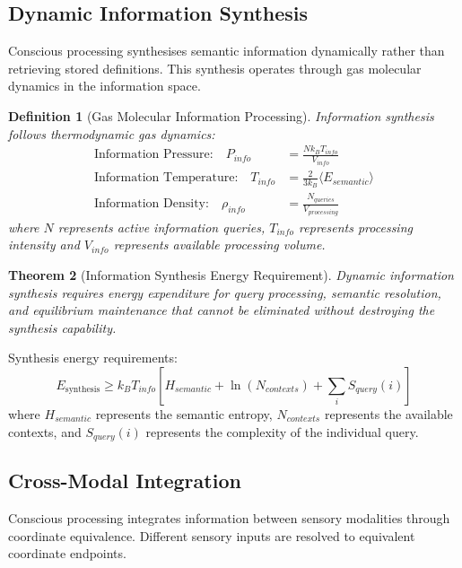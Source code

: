 \documentclass[12pt,a4paper]{article}
\newtheorem{theorem}{Theorem}[section]
\newtheorem{definition}[theorem]{Definition}
\begin{document}
\subsection{Dynamic Information Synthesis}

Conscious processing synthesises semantic information dynamically rather than retrieving stored definitions. This synthesis operates through gas molecular dynamics in the information space.

\begin{definition}[Gas Molecular Information Processing]
Information synthesis follows thermodynamic gas dynamics:
\begin{align}
\text{Information Pressure:} \quad P_{info} &= \frac{N k_B T_{info}}{V_{info}} \\
\text{Information Temperature:} \quad T_{info} &= \frac{2}{3k_B}\langle E_{semantic} \rangle \\
\text{Information Density:} \quad \rho_{info} &= \frac{N_{queries}}{V_{processing}}
\end{align}
where $N$ represents active information queries, $T_{info}$ represents processing intensity and $V_{info}$ represents available processing volume.
\end{definition}

\begin{theorem}[Information Synthesis Energy Requirement]
Dynamic information synthesis requires energy expenditure for query processing, semantic resolution, and equilibrium maintenance that cannot be eliminated without destroying the synthesis capability.
\end{theorem}

Synthesis energy requirements:
\begin{equation}
E_{\text{synthesis}} \geq k_B T_{info} \left[ H_{semantic} + \ln(N_{contexts}) + \sum_i S_{query}(i) \right]
\end{equation}
where $H_{semantic}$ represents the semantic entropy, $N_{contexts}$ represents the available contexts, and $S_{query}(i)$ represents the complexity of the individual query.

\subsection{Cross-Modal Integration}

Conscious processing integrates information between sensory modalities through coordinate equivalence. Different sensory inputs are resolved to equivalent coordinate endpoints.
\end{document}
